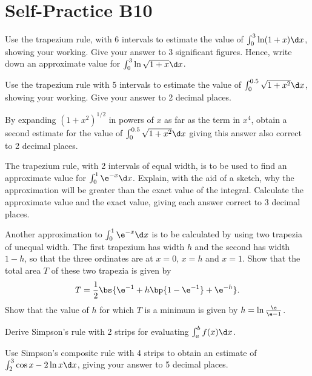 \section{Self-Practice B10}

\begin{problem}
    Use the trapezium rule, with 6 intervals to estimate the value of $\int_{0}^{3}\ln(1+x) \d x$, showing your working. Give your answer to 3 significant figures. Hence, write down an approximate value for $\int_{0}^{3}\ln\sqrt{1+x} \d x$.
\end{problem}

\begin{problem}
    Use the trapezium rule with 5 intervals to estimate the value of $\int_{0}^{0.5}\sqrt{1+x^{2}} \d x$, showing your working. Give your answer to 2 decimal places.

    By expanding $(1+x^{2})^{1/2}$ in powers of $x$ as far as the term in $x^{4}$, obtain a second estimate for the value of $\int_{0}^{0.5}\sqrt{1+x^{2}} \d x$ giving this answer also correct to 2 decimal places.
\end{problem}

\begin{problem}
    The trapezium rule, with 2 intervals of equal width, is to be used to find an approximate value for $\int_{0}^{1}\e^{-x} \d x$. Explain, with the aid of a sketch, why the approximation will be greater than the exact value of the integral. Calculate the approximate value and the exact value, giving each answer correct to 3 decimal places.

    Another approximation to $\int_{0}^{1}\e^{-x} \d x$ is to be calculated by using two trapezia of unequal width. The first trapezium has width $h$ and the second has width $1-h$, so that the three ordinates are at $x=0$, $x=h$ and $x=1$. Show that the total area $T$ of these two trapezia is given by \[T = \frac12 \bs{\e^{-1} + h \bp{1 - \e^{-1}} + \e^{-h}}.\] Show that the value of $h$ for which $T$ is a minimum is given by $h=\ln \frac{\e}{\e - 1}$. 
\end{problem}

\begin{problem}
    Derive Simpson's rule with 2 strips for evaluating $\int_{a}^{b} f(x) \d x$. 
    
    Use Simpson's composite rule with 4 strips to obtain an estimate of $\int_{2}^{3} \cos{x - 2} \ln x \d x$, giving your answer to 5 decimal places.
\end{problem}

